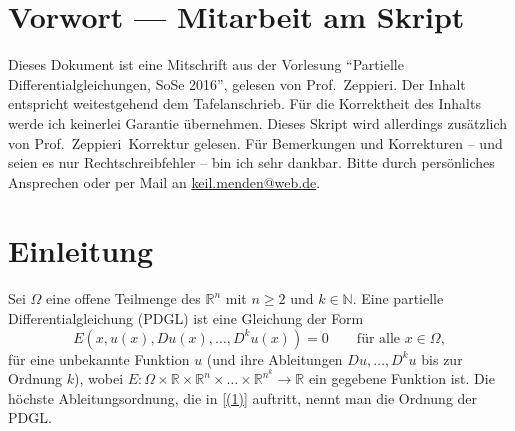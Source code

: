 \newcommand{\Semester}{SoSe 2016}
\newcommand{\fach}{Partielle Differentialgleichungen}
\newcommand{\prof}{Prof.\ Zeppieri}






\maketitle
\cleardoubleoddemptypage

\section*{Vorwort --- Mitarbeit am Skript}
Dieses Dokument ist eine Mitschrift aus der Vorlesung \enquote{\fach, \Semester}, gelesen von \prof. 
Der Inhalt entspricht weitestgehend dem Tafelanschrieb. 
Für die Korrektheit des Inhalts werde ich keinerlei Garantie übernehmen. Dieses Skript wird allerdings zusätzlich von \prof \, Korrektur gelesen. 
Für Bemerkungen und Korrekturen -- und seien es nur Rechtschreibfehler -- bin ich sehr dankbar. 
Bitte durch persönliches Ansprechen oder per Mail an \href{mailto:keil.menden@web.de}{keil.menden@web.de}.  

\newpage

\tableofcontents
\cleardoubleoddemptypage
{}
\setcounter{page}{1}

\section{Einleitung} 
\label{sec:einleitung}
\begin{definition}[PDGL]
	Sei $\Omega$ eine offene Teilmenge des $\mathbb{R}^n$ mit $n \geq 2$ und $ k \in \mathbb{N}$. 
	Eine partielle Differentialgleichung (PDGL) ist eine Gleichung der Form
	\begin{equation}\label{(1)}
		E(x,u(x),Du(x),\dots,D^ku(x))=0 \qquad \text{für alle }x \in \Omega,
	\end{equation}
	für eine unbekannte Funktion $u$ (und ihre Ableitungen $Du,\dots,D^ku$ bis zur Ordnung $k$), wobei $E: \Omega \times \mathbb{R} \times \mathbb{R}^n \times \dots \times \mathbb{R}^{n^k} \to \mathbb{R}$ ein gegebene Funktion ist. 
	Die höchste Ableitungsordnung, die in \eqref{(1)} auftritt, nennt man die Ordnung der PDGL.
\end{definition}

